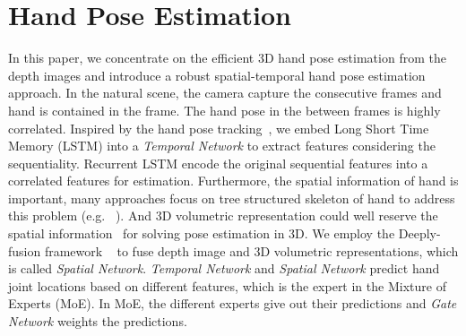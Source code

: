 \documentclass[journal,comsoc]{IEEEtran}
\begin{document}
\section{Hand Pose Estimation}\label{sec:hand pose estimation}
In this paper, we concentrate on the efficient 3D hand pose estimation from the depth images and
introduce a robust spatial-temporal hand pose estimation approach. In the natural scene, the camera
capture the consecutive frames and hand is contained in the frame.
The hand pose in the between frames is highly correlated. Inspired by the hand pose
tracking~\cite{quach2016depth}, we embed Long Short Time Memory (LSTM) into a \emph{Temporal Network}
to extract features considering the sequentiality. Recurrent LSTM encode the original sequential
features into a correlated features for estimation. Furthermore, the spatial information of hand is
important, many approaches focus on tree structured skeleton of hand to address this problem (e.g.
~\cite{li20153d, wan2016direction, ye2016spatial}). And 3D volumetric representation could well reserve
the spatial information~\cite{deng2017hand3d} for solving pose estimation in 3D. We employ the
Deeply-fusion framework ~\cite{wang2016deeply} to fuse depth image and 3D volumetric representations,
which is called \emph{Spatial Network}. \emph{Temporal Network} and \emph{Spatial Network} predict
hand joint locations based on different features, which is the expert in the Mixture of Experts
(MoE). In MoE, the different experts give out their predictions and \emph{Gate Network} weights the
predictions.




\end{document}
